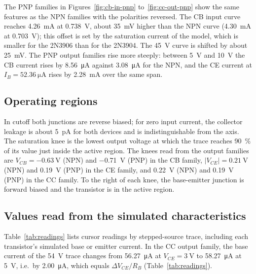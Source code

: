 \documentclass[12pt,a4paper]{article}
\begin{document}
	The PNP families in Figures~\ref{fig:cb-in-pnp} to~\ref{fig:cc-out-pnp}
	show the same features as the NPN families with the polarities reversed.
	The CB input curve reaches \SI{4.26}{\milli\ampere} at
	\SI{0.738}{\volt}, about \SI{35}{\milli\volt} higher than the NPN curve
	(\SI{4.30}{\milli\ampere} at \SI{0.703}{\volt}); this offset is set by the
	saturation current of the model, which is smaller for the 2N3906 than
	for the 2N3904. The \SI{45}{\volt} curve is shifted by about
	\SI{25}{\milli\volt}. The PNP output families rise more steeply: between \SI{5}{\volt} and \SI{10}{\volt} the CB
	current rises by \SI{8.56}{\micro\ampere} against \SI{3.08}{\micro\ampere}
	for the NPN, and the CE current at $I_B = \SI{52.36}{\micro\ampere}$
	rises by \SI{2.28}{\milli\ampere} over the same span.

	\subsection{Operating regions}
	In cutoff both junctions are reverse biased; for zero input current, the
	collector leakage is about \SI{5}{\pico\ampere} for both devices and is
	indistinguishable from the axis. The saturation knee is the lowest output
	voltage at which the trace reaches \SI{90}{\percent} of its value just
	inside the active region. The knees read from the output families are
	$V_{CB} = \SI{-0.63}{\volt}$ (NPN) and \SI{-0.71}{\volt} (PNP) in the
	CB family, $|V_{CE}| = \SI{0.21}{\volt}$ (NPN) and \SI{0.19}{\volt}
	(PNP) in the CE family, and \SI{0.22}{\volt} (NPN) and
	\SI{0.19}{\volt} (PNP) in the CC family. To the right of each knee, the
	base-emitter junction is forward biased and the transistor is in the
	active region.
	\newpage
	\subsection{Values read from the simulated characteristics}
	Table~\ref{tab:readings} lists cursor readings by stepped-source trace,
	including each transistor's simulated base or emitter current. In the CC
	output family, the base current of the \SI{54}{\volt} trace changes from
	\SI{56.27}{\micro\ampere} at
	$V_{CE} = \SI{3}{\volt}$ to \SI{58.27}{\micro\ampere} at \SI{5}{\volt},
	i.e.\ by \SI{2.00}{\micro\ampere}, which equals
	$\Delta V_{CE}/R_B$ (Table~\ref{tab:readings}).
\end{document}
